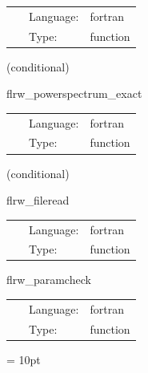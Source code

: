  \begin{tabular*}{160mm}{cll} 
~ & Language:  & fortran \\ 
~ & Type:  & function \\ 
\end{tabular*} 


\vspace{5mm}

   (conditional) 

\hspace{5mm} flrw\_powerspectrum\_exact 

\hspace{5mm}{\it sets up initial data for a power spectrum of perturbations to flrw spacetime } 


\hspace{5mm}

 \begin{tabular*}{160mm}{cll} 
~ & Language:  & fortran \\ 
~ & Type:  & function \\ 
\end{tabular*} 


\vspace{5mm}

   (conditional) 

\hspace{5mm} flrw\_fileread 

\hspace{5mm}{\it sets up initial data for linear perturbations to flrw spacetime from user-specified ascii files } 


\hspace{5mm}

 \begin{tabular*}{160mm}{cll} 
~ & Language:  & fortran \\ 
~ & Type:  & function \\ 
\end{tabular*} 


\vspace{5mm}


\hspace{5mm} flrw\_paramcheck 

\hspace{5mm}{\it check some parameters are set correctly } 


\hspace{5mm}

 \begin{tabular*}{160mm}{cll} 
~ & Language:  & fortran \\ 
~ & Type:  & function \\ 
\end{tabular*} 



\vspace{5mm}\parskip = 10pt 

